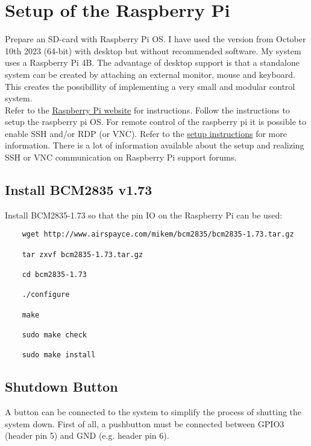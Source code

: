 \section{Setup of the Raspberry Pi}
Prepare an SD-card with Raspberry Pi OS. I have used the version from October 10th 2023 (64-bit) with desktop but without recommended software. My system uses a Raspberry Pi 4B. The advantage of desktop support is that a standalone system can be created by attaching an external monitor, mouse and keyboard. This creates the possibillity of implementing a very small and modular control system.\\

Refer to the \href{https://projects.raspberrypi.org/en/projects/raspberry-pi-setting-up/2}{Raspberry Pi website} for instructions. Follow the instructions to setup the raspberry pi OS. For remote control of the raspberry pi it is possible to enable SSH and/or RDP (or VNC). Refer to the \href{https://projects.raspberrypi.org/en/projects/raspberry-pi-setting-up/4}{setup instructions} for more information. There is a lot of information available about the setup and realizing SSH or VNC communication on Raspberry Pi support forums.

\subsection{Install BCM2835 v1.73}
Install BCM2835-1.73 so that the pin IO on the Raspberry Pi can be used:
\begin{verbatim}
	wget http://www.airspayce.com/mikem/bcm2835/bcm2835-1.73.tar.gz 
	
	tar zxvf bcm2835-1.73.tar.gz
	
	cd bcm2835-1.73
	
	./configure
	
	make
	
	sudo make check
	
	sudo make install
\end{verbatim}

\subsection{Shutdown Button}


A button can be connected to the system to simplify the process of shutting the system down. First of all, a pushbutton must be connected between GPIO3 (header pin 5) and GND (e.g. header pin 6). \\

